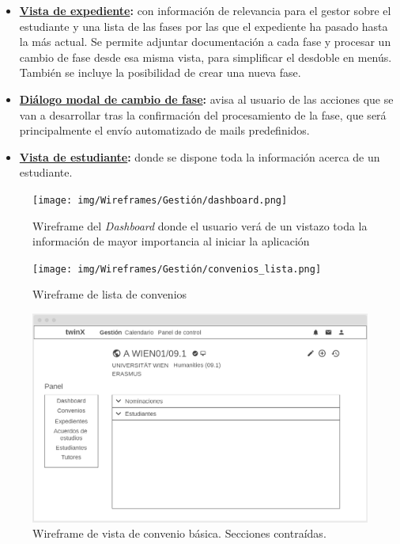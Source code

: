 \begin{itemize}
	\item \textbf{\hyperref[fig:expediente_detalleWF]{Vista de expediente}:} con información de relevancia para el gestor sobre el estudiante y una lista de las fases por las que el expediente ha pasado hasta la más actual. Se permite adjuntar documentación a cada fase y procesar un cambio de fase desde esa misma vista, para simplificar el desdoble en menús. También se incluye la posibilidad de crear una nueva fase.
	\item \textbf{\hyperref[fig:cambio_faseWF]{Diálogo modal de cambio de fase}:} avisa al usuario de las acciones que se van a desarrollar tras la confirmación del procesamiento de la fase, que será principalmente el envío automatizado de mails predefinidos.
	\item \textbf{\hyperref[fig:estudiante_detalleWF]{Vista de estudiante}:} donde se dispone toda la información acerca de un estudiante.
\end{itemize}

\begin{figure}
	\centering
	\texttt{[image: img/Wireframes/Gestión/dashboard.png]}
	\caption[Wireframe de \textit{Dashboard}]{Wireframe del \textit{Dashboard} donde el usuario verá de un vistazo toda la información de mayor importancia al iniciar la aplicación}
	\label{fig:dashboardWF}
\end{figure}

\begin{figure}
	\centering
	\texttt{[image: img/Wireframes/Gestión/convenios\_lista.png]}
	\caption{Wireframe de lista de convenios}
	\label{fig:convenios_listaWF}
\end{figure}

\begin{figure}
\centering
\includegraphics[width=\textwidth]{img/Wireframes/Gestión/vista_convenio_básica_contraída.png}
\caption[Wireframe de vista de convenio básica]{Wireframe de vista de convenio básica. Secciones contraídas.}
\label{fig:vista_conv_basica_contWF}
\end{figure}

